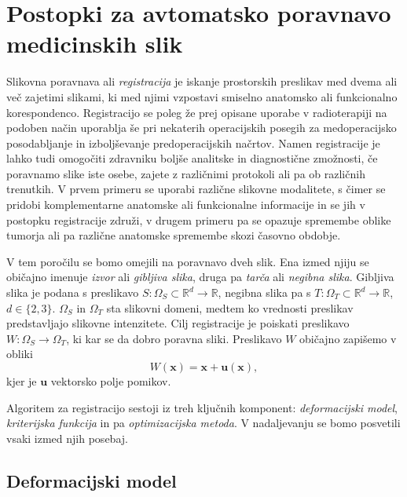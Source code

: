 \documentclass[journal]{IEEEtran}
\begin{document}
\section{Postopki za avtomatsko poravnavo medicinskih slik}

Slikovna poravnava ali \emph{registracija} je iskanje prostorskih preslikav med dvema ali več zajetimi slikami, ki med njimi vzpostavi smiselno anatomsko ali funkcionalno korespondenco. Registracijo se poleg že prej opisane uporabe v radioterapiji na podoben način uporablja še pri nekaterih operacijskih posegih za medoperacijsko posodabljanje in izboljševanje predoperacijskih načrtov. Namen registracije je lahko tudi omogočiti zdravniku boljše analitske in diagnostične zmožnosti, če poravnamo slike iste osebe, zajete z različnimi protokoli ali pa ob različnih trenutkih. V prvem primeru se uporabi različne slikovne modalitete, s čimer se pridobi komplementarne anatomske ali funkcionalne informacije in se jih v postopku registracije združi, v drugem primeru pa se opazuje spremembe oblike tumorja ali pa različne anatomske spremembe skozi časovno obdobje.

V tem poročilu se bomo omejili na poravnavo dveh slik. Ena izmed njiju se običajno imenuje \emph{izvor} ali \emph{gibljiva slika}, druga pa \emph{tarča} ali \emph{negibna slika}. Gibljiva slika je podana s preslikavo $S\colon\Omega_S\subset\mathbb{R}^d\to\mathbb{R}$, negibna slika pa s $T\colon\Omega_T\subset\mathbb{R}^d\to\mathbb{R}$, $d\in\{2,3\}$. $\Omega_S$ in $\Omega_T$ sta slikovni domeni, medtem ko vrednosti preslikav predstavljajo slikovne intenzitete. Cilj registracije je poiskati preslikavo $W\colon\Omega_S\to\Omega_T$, ki kar se da dobro poravna sliki. Preslikavo $W$ običajno zapišemo v obliki
\begin{equation}
 W(\boldsymbol{x}) = \boldsymbol{x} + \boldsymbol{u}(\boldsymbol{x}),
\end{equation}
kjer je $\boldsymbol{u}$ vektorsko polje pomikov.

Algoritem za registracijo sestoji iz treh ključnih komponent: \emph{deformacijski model}, \emph{kriterijska funkcija} in pa \emph{optimizacijska metoda}. V nadaljevanju se bomo posvetili vsaki izmed njih posebaj.

\subsection{Deformacijski model}
\end{document}
